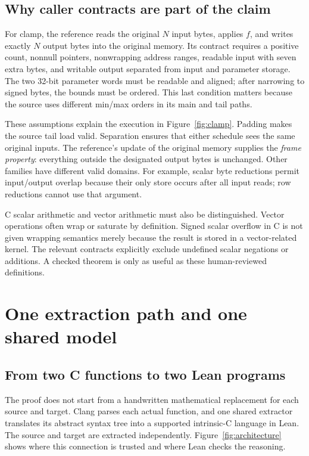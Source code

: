 \documentclass[11pt]{article}
\begin{document}
\subsection{Why caller contracts are part of the claim}
For clamp, the reference reads the original $N$ input bytes, applies $f$, and writes exactly $N$ output bytes into the original memory. Its contract requires a positive count, nonnull pointers, nonwrapping address ranges, readable input with seven extra bytes, and writable output separated from input and parameter storage. The two 32-bit parameter words must be readable and aligned; after narrowing to signed bytes, the bounds must be ordered. This last condition matters because the source uses different min/max orders in its main and tail paths.

These assumptions explain the execution in Figure~\ref{fig:clamp}. Padding makes the source tail load valid. Separation ensures that either schedule sees the same original inputs. The reference's update of the original memory supplies the \emph{frame property}: everything outside the designated output bytes is unchanged. Other families have different valid domains. For example, scalar byte reductions permit input/output overlap because their only store occurs after all input reads; row reductions cannot use that argument.

C scalar arithmetic and vector arithmetic must also be distinguished. Vector operations often wrap or saturate by definition. Signed scalar overflow in C is not given wrapping semantics merely because the result is stored in a vector-related kernel. The relevant contracts explicitly exclude undefined scalar negations or additions. A checked theorem is only as useful as these human-reviewed definitions.

\section{One extraction path and one shared model}
\subsection{From two C functions to two Lean programs}
The proof does not start from a handwritten mathematical replacement for each source and target. Clang parses each actual function, and one shared extractor translates its abstract syntax tree into a supported intrinsic-C language in Lean. The source and target are extracted independently. Figure~\ref{fig:architecture} shows where this connection is trusted and where Lean checks the reasoning.
\end{document}
